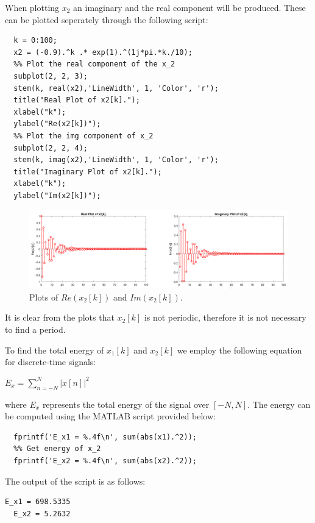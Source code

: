 \documentclass[a4paper, 10pt]{article}
\begin{document}
\noindent When plotting $x_2$ an imaginary and the real component will be produced. These can be plotted seperately 
through the following script:
\begin{lstlisting}[style=Matlab-editor, basicstyle=\small\ttfamily]
  %% Define x_2
  k = 0:100;
  x2 = (-0.9).^k .* exp(1).^(1j*pi.*k./10);
  %% Plot the real component of the x_2
  subplot(2, 2, 3);
  stem(k, real(x2),'LineWidth', 1, 'Color', 'r');
  title("Real Plot of x2[k].");
  xlabel("k");
  ylabel("Re(x2[k])");
  %% Plot the img component of x_2
  subplot(2, 2, 4);
  stem(k, imag(x2),'LineWidth', 1, 'Color', 'r');
  title("Imaginary Plot of x2[k].");
  xlabel("k");
  ylabel("Im(x2[k])");
\end{lstlisting}
\begin{figure}[H]
  \centering
  \includegraphics[width=15cm]{images/x2_plot.png}
  \caption{Plots of $Re(x_2[k])$ and $Im(x_2[k])$.}
\end{figure}
It is clear from the plots that $x_2[k]$ is not periodic, therefore it is not necessary to find a period.

\hfill

\noindent To find the total energy of $x_1[k]$ and $x_2[k]$ we employ the following equation for discrete-time signals:
\begin{center}
  $E_x = \sum\limits_{n=-N}^{N} |x[n]|^2$ 
\end{center}
where $E_x$ represents the total energy of the signal over $[-N, N]$. The energy can be computed using the MATLAB script provided below:
\begin{lstlisting}[style=Matlab-editor, basicstyle=\small\ttfamily]
  %% Get energy of x_1
  fprintf('E_x1 = %.4f\n', sum(abs(x1).^2));
  %% Get energy of x_2
  fprintf('E_x2 = %.4f\n', sum(abs(x2).^2));
\end{lstlisting}
The output of the script is as follows:
\begin{lstlisting}[basicstyle=\small\ttfamily]
  E_x1 = 698.5335
  E_x2 = 5.2632
\end{lstlisting}
\end{document}
